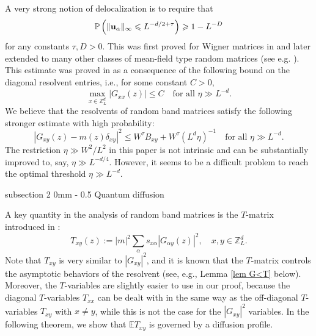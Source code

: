\documentclass{article}
\makeatletter
\newcommand{\1}{\mathds{1}}
\numberwithin{equation}{section}
\newcommand{\bu}{{\bf{u}}}
\newcommand{\al}{\alpha}
\newcommand{\be}{\begin{equation}}
\newcommand{\ee}{\end{equation}}
\renewcommand{\leq}{\leqslant}
\renewcommand{\geq}{\geqslant}
\renewcommand{\le}{\leq}
\renewcommand{\ge}{\geq}
\newcommand{\E}{\mathbb{E}}
\newcommand{\Z}{\mathbb{Z}}
\theoremstyle{plain} %
\theoremstyle{remark}
\newcommand{\cor}{\color{red}}
\renewcommand{\subsection}{\@startsection
{subsection}%
{2}%
{0mm}%
{-\baselineskip}%
{0.5\baselineskip}%
{\normalfont\bf\itshape}} %
\newcommand{\hty}[1]{{\cor (ht: #1) }}
\makeatother
\begin{document}
A very strong notion of delocalization is to require that
$$\mathbb P \left(\|\bu_\al\|_\infty \le L^{-d/2 +\tau}\right)\ge  1-L^{-D} 
$$
for any constants $\tau, D>0$. This was first proved for Wigner matrices in \cite{ESY_local,ESY1,ErdYauYin2012Univ,ErdYauYin2012Rig} and later extended to many other classes of mean-field type random matrices (see e.g. \cite{isotropic,PartI,EKYY_ER1,HY_Regulard,BHY2019,HKM2019,BKH2017}). This estimate  was proved in \cite{ErdYauYin2012Univ} as a consequence of the following bound on the diagonal resolvent entries, i.e.,  for some constant $C>0$, %
$$
\max_{x\in \Z_L^d}   |G_{xx} (z) | \le  C  \quad \text{for all $\eta\gg L^{-d}$}.
$$
We believe  that the resolvents of random band matrices satisfy the following stronger estimate with high probability:
\be
|G_{xy} (z) -m(z)\delta_{xy}|^2 \le W^\tau B_{xy} + W^\tau (L^d\eta)^{-1} \quad \text{for all $\eta\gg L^{-d}$}.
\ee
The restriction $\eta\gg W^2/L^2$ in this paper is not intrinsic and can be substantially improved to, say, $\eta\gg L^{-d/4}$. However, it seems to be a difficult problem to reach the optimal threshold $\eta\gg L^{-d}$. 


\subsection{Quantum diffusion} \label{sec_diffu}


A key quantity in the analysis of random band matrices is the $T$-matrix introduced in \cite{delocal}: %
\be\label{defGT}
T_{xy}(z):=|m|^2\sum_\al s_{x\al}|G_{\al y}(z)|^2,\quad x,y \in \Z_L^d.
\ee
Note that $T_{xy}$ is very similar to $|G_{xy}|^2$, and it is known that the $T$-matrix controls the asymptotic behaviors of the resolvent  (see, e.g., Lemma \ref{lem G<T} below). Moreover, the $T$-variables are slightly easier to use in our proof, because the diagonal $T$-variables $T_{xx}$ can be dealt with in the same way as the off-diagonal $T$-variables $T_{xy}$ with $x\ne y$, while this is not the case for the $|G_{xy}|^2$ variables.
In the following theorem, we show that  $\E T_{xy}$ is governed by a diffusion profile. %
\end{document}
